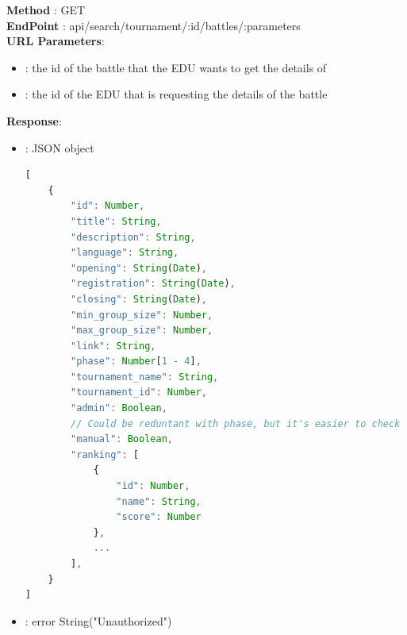 \textbf{Method} : GET \\
\textbf{EndPoint} : api/search/tournament/:id/battles/:parameters \\
\textbf{URL Parameters}:
\begin{itemize}
    \item {}: the id of the battle that the EDU wants to get the details of
    \item {}: the id of the EDU that is requesting the details of the battle
\end{itemize}
\textbf{Response}:
\begin{itemize}
    \item {} : JSON object
          \begin{lstlisting}[language=JavaScript, label={lst:jscode}, basicstyle=\ttfamily]
[
    {
        "id": Number,
        "title": String,
        "description": String,
        "language": String,
        "opening": String(Date),
        "registration": String(Date),
        "closing": String(Date),
        "min_group_size": Number,
        "max_group_size": Number,
        "link": String,
        "phase": Number[1 - 4],
        "tournament_name": String,
        "tournament_id": Number,
        "admin": Boolean,
        // Could be reduntant with phase, but it's easier to check
        "manual": Boolean,
        "ranking": [
            {
                "id": Number,
                "name": String,
                "score": Number
            },
            ...
        ],
    }
]
            \end{lstlisting}
    \item {} : error String("Unauthorized")
\end{itemize}

